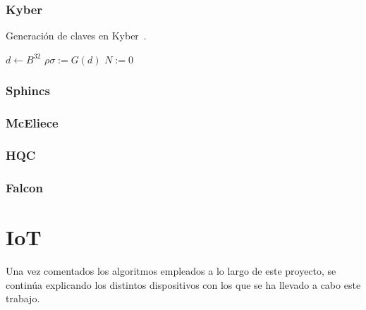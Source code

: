 \subsubsection{Kyber}\label{subsubsec:kyber}


\begin{algorithm}
    \caption{Generación de claves en Kyber~\cite{kyber_spec}.}
    \label{alg:gen_kyber}
    \hspace{2mm}$d \gets B^{32}$\newline
    $\rho\sigma := G(d)$\newline
    $N := 0$\newline
\end{algorithm}


\subsubsection{Sphincs}\label{subsubsec:sphincs}

\subsubsection{McEliece}\label{subsubsec:mceliece}

\subsubsection{HQC}\label{subsubsec:hqc}

\subsubsection{Falcon}\label{subsubsec:falcon}




\section{IoT}\label{sec:iot}

Una vez comentados los algoritmos empleados a lo largo de este proyecto, se continúa explicando los distintos dispositivos con los que se ha llevado a cabo este trabajo.


